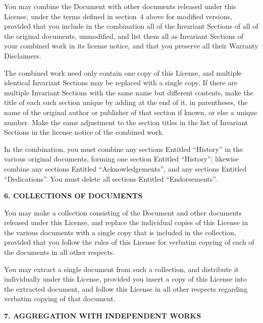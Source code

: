 \begin{scriptsize}
\begin{multicols}{2}
    You may combine the Document with other documents released under this License, under the terms defined in section~4 above for modified versions, provided that you include in the combination all of the Invariant Sections of all of the original documents, unmodified, and list them all as Invariant Sections of your combined work in its license notice, and that you preserve all their Warranty Disclaimers.

    The combined work need only contain one copy of this License, and multiple identical Invariant Sections may be replaced with a single copy. If there are multiple Invariant Sections with the same name but different contents, make the title of each such section unique by adding at the end of it, in parentheses, the name of the original author or publisher of that section if known, or else a unique number. Make the same adjustment to the section titles in the list of Invariant Sections in the license notice of the combined work.

    In the combination, you must combine any sections Entitled ``History'' in the various original documents, forming one section Entitled ``History''; likewise combine any sections Entitled ``Acknowledgements'', and any sections Entitled ``Dedications''.  You must delete all sections Entitled ``Endorsements''.

    \begin{center}
      {\bf 6. COLLECTIONS OF DOCUMENTS\par}
    \end{center}

    You may make a collection consisting of the Document and other documents released under this License, and replace the individual copies of this License in the various documents with a single copy that is included in the collection, provided that you follow the rules of this License for verbatim copying of each of the documents in all other respects.

    You may extract a single document from such a collection, and distribute it individually under this License, provided you insert a copy of this License into the extracted document, and follow this License in all other respects regarding verbatim copying of that document.

    \begin{center}
      {\bf 7. AGGREGATION WITH INDEPENDENT WORKS\par}
    \end{center}


\end{multicols}
\end{scriptsize}
